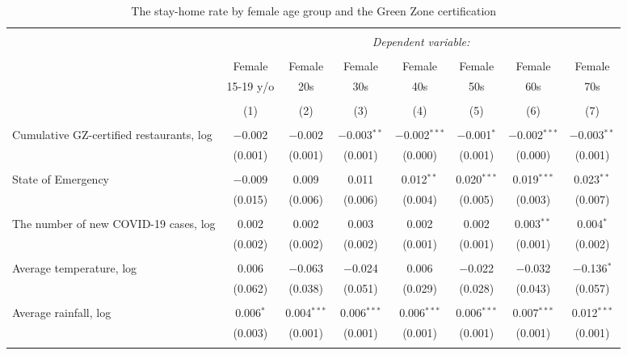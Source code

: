 
\begin{table}[H] \centering 
  \caption{The stay-home rate by female age group and the Green Zone certification} 
  \label{} 
\footnotesize 
\begin{tabular}{@{\extracolsep{-11pt}}lccccccc} 
\\[-1.8ex]\hline 
\hline \\[-1.8ex] 
 & \multicolumn{7}{c}{\textit{Dependent variable:}} \\ 
\cline{2-8} 
\\[-1.8ex] & Female & Female & Female & Female & Female & Female & Female \\ 
 & 15-19 y/o & 20s & 30s & 40s & 50s & 60s & 70s \\ 
\\[-1.8ex] & (1) & (2) & (3) & (4) & (5) & (6) & (7)\\ 
\hline \\[-1.8ex] 
 Cumulative GZ-certified restaurants, log & $-$0.002 & $-$0.002 & $-$0.003$^{**}$ & $-$0.002$^{***}$ & $-$0.001$^{*}$ & $-$0.002$^{***}$ & $-$0.003$^{**}$ \\ 
  & (0.001) & (0.001) & (0.001) & (0.000) & (0.001) & (0.000) & (0.001) \\ 
  & & & & & & & \\ 
 State of Emergency & $-$0.009 & 0.009 & 0.011 & 0.012$^{**}$ & 0.020$^{***}$ & 0.019$^{***}$ & 0.023$^{**}$ \\ 
  & (0.015) & (0.006) & (0.006) & (0.004) & (0.005) & (0.003) & (0.007) \\ 
  & & & & & & & \\ 
 The number of new COVID-19 cases, log & 0.002 & 0.002 & 0.003 & 0.002 & 0.002 & 0.003$^{**}$ & 0.004$^{*}$ \\ 
  & (0.002) & (0.002) & (0.002) & (0.001) & (0.001) & (0.001) & (0.002) \\ 
  & & & & & & & \\ 
 Average temperature, log & 0.006 & $-$0.063 & $-$0.024 & 0.006 & $-$0.022 & $-$0.032 & $-$0.136$^{*}$ \\ 
  & (0.062) & (0.038) & (0.051) & (0.029) & (0.028) & (0.043) & (0.057) \\ 
  & & & & & & & \\ 
 Average rainfall, log & 0.006$^{*}$ & 0.004$^{***}$ & 0.006$^{***}$ & 0.006$^{***}$ & 0.006$^{***}$ & 0.007$^{***}$ & 0.012$^{***}$ \\ 
  & (0.003) & (0.001) & (0.001) & (0.001) & (0.001) & (0.001) & (0.001) \\ 
  & & & & & & & \\ 

\end{tabular}
\end{table}
